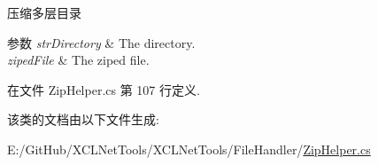 压缩多层目录 


\begin{DoxyParams}{参数}
{\em str\+Directory} & The directory.\\
\hline
{\em ziped\+File} & The ziped file.\\
\hline
\end{DoxyParams}


在文件 Zip\+Helper.\+cs 第 107 行定义.



该类的文档由以下文件生成\+:\begin{DoxyCompactItemize}
\item 
E\+:/\+Git\+Hub/\+X\+C\+L\+Net\+Tools/\+X\+C\+L\+Net\+Tools/\+File\+Handler/\hyperlink{_zip_helper_8cs}{Zip\+Helper.\+cs}\end{DoxyCompactItemize}
